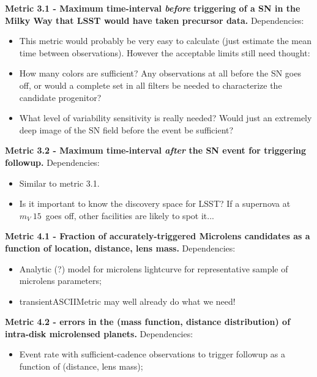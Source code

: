 {\bf Metric 3.1 - Maximum time-interval {\it before} triggering of a SN in the Milky Way that LSST would have taken precursor data.}
Dependencies:
\begin{itemize}
  \item This metric would probably be very easy to calculate (just estimate the mean time between observations). However the acceptable limits still need thought:
  \item How many colors are sufficient? Any observations at all before the SN goes off, or would a complete set in all filters be needed to characterize the candidate progenitor?
    \item What level of variability sensitivity is really needed? Would just an extremely deep image of the SN field before the event be sufficient?
\end{itemize}
{\bf Metric 3.2 - Maximum time-interval {\it after} the SN event for triggering followup.}
Dependencies:
\begin{itemize}
  \item Similar to metric 3.1. 
    \item Is it important to know the discovery space for LSST? If a
      supernova at $m_V~15$~goes off, other facilities are likely to
      spot it...
\end{itemize}

{\bf Metric 4.1 - Fraction of accurately-triggered Microlens candidates as a function of location, distance, lens mass.}
Dependencies:
\begin{itemize}
  \item Analytic (?) model for microlens lightcurve for representative sample of microlens parameters;
    \item transientASCIIMetric may well already do what we need! 
\end{itemize}

{\bf Metric 4.2 - errors in the (mass function, distance distribution) of intra-disk microlensed planets.}
Dependencies:
\begin{itemize}
  \item Event rate with sufficient-cadence observations to trigger followup as a function of (distance, lens mass);
\end{itemize}

